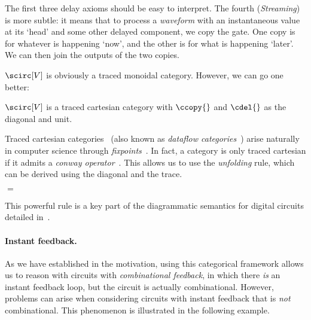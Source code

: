 \documentclass[11pt,numbib]{article}
\begin{document}
\noindent
The first three delay axioms should be easy to interpret.
The fourth (\emph{Streaming}) is more subtle: it means that to process a \emph{waveform} with an instantaneous value at its `head' and some other delayed component, we copy the gate.
One copy is for whatever is happening `now', and the other is for what is happening `later'.
We can then join the outputs of the two copies.

$\scirc[V]$ is obviously a traced monoidal category.
However, we can go one better:

\begin{theorem}
    $\scirc[V]$ is a traced cartesian category with $\ccopy{}$ and $\cdel{}$ as the diagonal and unit.
\end{theorem}

\noindent
Traced cartesian categories~ (also known as \emph{dataflow categories}~\cite[Section~6.4]{selinger2010survey}) arise naturally in computer science through \emph{fixpoints}~\parencite{cazanescu1990algebraic,cazanescu1994feedback}.
In fact, a category is only traced cartesian if it admits a \emph{conway operator}~\parencite{hasegawa1997recursion}.
This allows us to use the \emph{unfolding} rule, which can be derived using the diagonal and the trace.

\begin{center}
    \quad$=$\quad
\end{center}

\noindent
This powerful rule is a key part of the diagrammatic semantics for digital circuits detailed in~\parencite{ghica2017diagrammatictech}.

\paragraph*{Instant feedback.}

As we have established in the motivation, using this categorical framework allows us to reason with circuits with \emph{combinational feedback}, in which there \emph{is} an instant feedback loop, but the circuit is actually combinational.
However, problems can arise when considering circuits with instant feedback that is \emph{not} combinational.
This phenomenon is illustrated in the following example.
\end{document}
